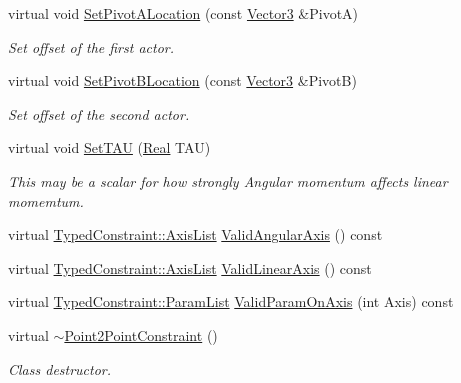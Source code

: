 \begin{DoxyCompactItemize}
virtual void \hyperlink{classMezzanine_1_1Point2PointConstraint_a454b36d992f990e0058f2aba00ee8692}{SetPivotALocation} (const \hyperlink{classMezzanine_1_1Vector3}{Vector3} \&PivotA)
\begin{DoxyCompactList}\small\item\em Set offset of the first actor. \item\end{DoxyCompactList}\item 
virtual void \hyperlink{classMezzanine_1_1Point2PointConstraint_a746402f9ca269fc4838b8f3f1933dc48}{SetPivotBLocation} (const \hyperlink{classMezzanine_1_1Vector3}{Vector3} \&PivotB)
\begin{DoxyCompactList}\small\item\em Set offset of the second actor. \item\end{DoxyCompactList}\item 
virtual void \hyperlink{classMezzanine_1_1Point2PointConstraint_a9eba349fe0f12483330b9c309e305168}{SetTAU} (\hyperlink{namespaceMezzanine_a726731b1a7df72bf3583e4a97282c6f6}{Real} TAU)
\begin{DoxyCompactList}\small\item\em This may be a scalar for how strongly Angular momentum affects linear momemtum. \item\end{DoxyCompactList}\item 
virtual \hyperlink{classMezzanine_1_1TypedConstraint_ac6b8e0839cd686f73d0c9e9ad5db47a4}{TypedConstraint::AxisList} \hyperlink{classMezzanine_1_1Point2PointConstraint_a3398535453abbf5e573aec88669a41a6}{ValidAngularAxis} () const 
\item 
virtual \hyperlink{classMezzanine_1_1TypedConstraint_ac6b8e0839cd686f73d0c9e9ad5db47a4}{TypedConstraint::AxisList} \hyperlink{classMezzanine_1_1Point2PointConstraint_a3ee9d805802f459d6e418f4c0d9f83c1}{ValidLinearAxis} () const 
\item 
virtual \hyperlink{classMezzanine_1_1TypedConstraint_abd499db29c9e9755e9bb547d29eaa49a}{TypedConstraint::ParamList} \hyperlink{classMezzanine_1_1Point2PointConstraint_a3170aad8175d6c6c064e6d4e8e30cfa6}{ValidParamOnAxis} (int Axis) const 
\item 
virtual \hyperlink{classMezzanine_1_1Point2PointConstraint_a9a928ba39d2b8f9887d981afd8f776aa}{$\sim$Point2PointConstraint} ()
\begin{DoxyCompactList}\small\item\em Class destructor. \item\end{DoxyCompactList}\end{DoxyCompactItemize}
